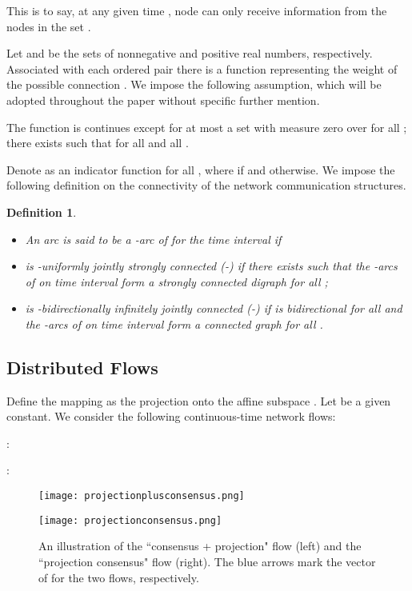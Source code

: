 \documentclass[a4paper, 11pt]{article}
\newtheorem{definition}{Definition}
\begin{document}
This is to say, at any given time , node  can only receive information from the nodes in the set .

Let  and  be the sets of nonnegative and positive real numbers, respectively. Associated with each ordered pair  there is a function  representing the weight of the possible connection . We impose the following assumption, which will be adopted throughout the paper without specific  further mention.

\medskip

 The function  is continues except for at most a set with measure zero over  for all ; there exists  such that  for all  and all .

\medskip




Denote  as an indicator function for all , where   if  and  otherwise.  We impose the following definition on the connectivity of the network communication structures.

\begin{definition}
\begin{itemize}
\item[(i)] An arc  is said to be a -arc of  for the
time interval   if 

\item[(ii)]  is -uniformly jointly strongly connected (-) if there exists  such that  the  -arcs of   on time interval  form a  strongly connected digraph for all ;

\item[(iii)]  is -bidirectionally infinitely  jointly  connected (-) if    is bidirectional for all  and the  -arcs of   on time interval  form a connected graph for all .
    \end{itemize}
\end{definition}
\subsection{Distributed Flows}
Define the mapping  as the projection onto the affine subspace . Let  be a given constant. We consider the following continuous-time network flows:

\medskip

:

:




\begin{figure*}
\begin{minipage}[t]{0.5\linewidth}
\centering
\texttt{[image: projectionplusconsensus.png]}
\end{minipage}\begin{minipage}[t]{0.5\linewidth}
\centering
\texttt{[image: projectionconsensus.png]}
\end{minipage}
\caption{An illustration of the ``consensus + projection" flow (left) and the ``projection consensus" flow (right). The blue arrows mark the vector of  for the two flows, respectively.}
\label{fig:twoflows}
\end{figure*}
\end{document}
